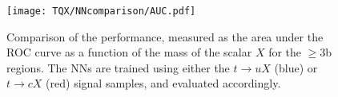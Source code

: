 \begin{figure}[htb]
    \RawFloats
    \centering
    \texttt{[image: TQX/NNcomparison/AUC.pdf]}

    \caption{Comparison of the performance, measured as the area under the ROC curve as a function of the mass of the scalar $X$ for the $\ge$3b regions. The NNs are trained using either the $t\to uX$ (blue) or $t\to cX$ (red) signal samples, and evaluated accordingly.
    }
    \label{tqX:NNAUC}
\end{figure}

\clearpage